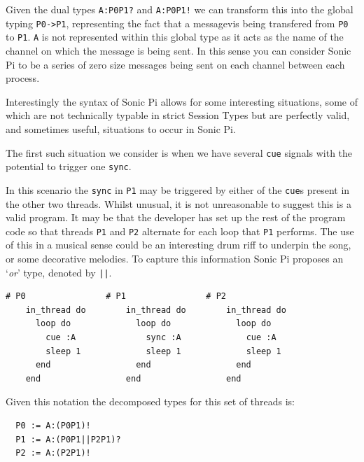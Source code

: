 \documentclass[11pt, abstracton, twoside, titlepage=true]{scrartcl}
\begin{document}
Given the dual types \texttt{A:P0P1?} and \texttt{A:P0P1!} we can transform 
this into the global typing \texttt{P0->P1}, representing the fact that a 
messagevis being transfered from \texttt{P0} to \texttt{P1}. \texttt{A} is not
represented within this global type as it acts as the name of the channel on
which the message is being sent. In this sense you can consider Sonic Pi
to be a series of zero size messages being sent on each channel between
each process.

Interestingly the syntax of Sonic Pi allows for some interesting situations,
some of which are not technically typable in strict Session Types but are
perfectly valid, and sometimes useful, situations to occur in Sonic Pi.

The first such situation we consider is when we have several \texttt{cue}
signals with the potential to trigger one \texttt{sync}.



In this scenario the \texttt{sync} in \texttt{P1} may be triggered by either
of the \texttt{cue}s present in the other two threads. Whilst unusual,
it is not unreasonable to suggest this is a valid program. It may be that the
developer has set up the rest of the program code so that threads \texttt{P1} 
and \texttt{P2} alternate for each loop that \texttt{P1} performs. The use
of this in a musical sense could be an interesting drum riff to underpin the
song, or some decorative melodies. To capture this information Sonic Pi 
proposes an `\emph{or}' type, denoted by \texttt{||}. 


\begin{minipage}{\textwidth}
	\begin{lstlisting}[style = sonicpi]
    # P0                # P1                # P2
    in_thread do        in_thread do        in_thread do
      loop do             loop do             loop do
        cue :A              sync :A             cue :A
        sleep 1             sleep 1             sleep 1
      end                 end                 end
    end                 end                 end
	\end{lstlisting}
\end{minipage}


Given this notation the
decomposed types for this set of threads is:
\\
\begin{lstlisting}
  P0 := A:(P0P1)!
  P1 := A:(P0P1||P2P1)?
  P2 := A:(P2P1)!
\end{lstlisting}
\end{document}
